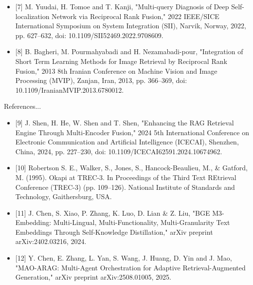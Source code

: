\begin{frame}
\begin{itemize}
        \item \tiny [7] M. Yuudai, H. Tomoe and T. Kanji, "Multi-query Diagnosis of Deep Self-localization Network via Reciprocal Rank Fusion," 2022 IEEE/SICE International Symposium on System Integration (SII), Narvik, Norway, 2022, pp. 627–632, doi: 10.1109/SII52469.2022.9708609.
        \vspace{0.3cm}
        
        \item \tiny [8] B. Bagheri, M. Pourmahyabadi and H. Nezamabadi-pour, "Integration of Short Term Learning Methods for Image Retrieval by Reciprocal Rank Fusion," 2013 8th Iranian Conference on Machine Vision and Image Processing (MVIP), Zanjan, Iran, 2013, pp. 366–369, doi: 10.1109/IranianMVIP.2013.6780012.
        \vspace{0.3cm}
    \end{itemize}
\end{frame}

\begin{frame}{References...}
    \begin{itemize}
        \item \tiny [9] J. Shen, H. He, W. Shen and T. Shen, "Enhancing the RAG Retrieval Engine Through Multi-Encoder Fusion," 2024 5th International Conference on Electronic Communication and Artificial Intelligence (ICECAI), Shenzhen, China, 2024, pp. 227–230, doi: 10.1109/ICECAI62591.2024.10674962.
        \vspace{0.3cm}

        \item \tiny[10] Robertson S. E., Walker, S., Jones, S., Hancock-Beaulieu, M., \& Gatford, M. (1995). Okapi at TREC-3. In Proceedings of the Third Text REtrieval Conference (TREC-3) (pp. 109–126). National Institute of Standards and Technology, Gaithersburg, USA. 
        \vspace{0.3cm}
        
        \item \tiny[11]  J. Chen, S. Xiao, P. Zhang, K. Luo, D. Lian \& Z. Liu, "BGE M3-Embedding: Multi-Lingual, Multi-Functionality, Multi-Granularity Text Embeddings Through Self-Knowledge Distillation," arXiv preprint arXiv:2402.03216, 2024. 
        \vspace{0.3cm}

        \item \tiny[12] Y. Chen, E. Zhang, L. Yan, S. Wang, J. Huang, D. Yin and J. Mao, "MAO-ARAG: Multi-Agent Orchestration for Adaptive Retrieval-Augmented Generation," arXiv preprint arXiv:2508.01005, 2025.
        \vspace{0.3cm}
        
\end{itemize}
\end{frame}
